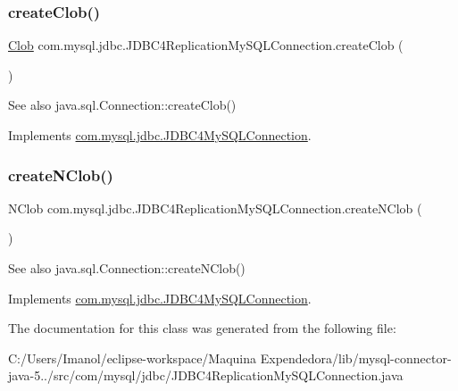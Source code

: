 \subsubsection{\texorpdfstring{create\+Clob()}{createClob()}}
{\footnotesize\ttfamily \mbox{\hyperlink{classcom_1_1mysql_1_1jdbc_1_1_clob}{Clob}} com.\+mysql.\+jdbc.\+J\+D\+B\+C4\+Replication\+My\+S\+Q\+L\+Connection.\+create\+Clob (\begin{DoxyParamCaption}{ }\end{DoxyParamCaption})}

\begin{DoxySeeAlso}{See also}
java.\+sql.\+Connection\+::create\+Clob() 
\end{DoxySeeAlso}


Implements \mbox{\hyperlink{interfacecom_1_1mysql_1_1jdbc_1_1_j_d_b_c4_my_s_q_l_connection}{com.\+mysql.\+jdbc.\+J\+D\+B\+C4\+My\+S\+Q\+L\+Connection}}.

\mbox{\label{classcom_1_1mysql_1_1jdbc_1_1_j_d_b_c4_replication_my_s_q_l_connection_ae41d8d69ab45f2c830674a653fa9bff2}} 
\subsubsection{\texorpdfstring{create\+N\+Clob()}{createNClob()}}
{\footnotesize\ttfamily N\+Clob com.\+mysql.\+jdbc.\+J\+D\+B\+C4\+Replication\+My\+S\+Q\+L\+Connection.\+create\+N\+Clob (\begin{DoxyParamCaption}{ }\end{DoxyParamCaption})}

\begin{DoxySeeAlso}{See also}
java.\+sql.\+Connection\+::create\+N\+Clob() 
\end{DoxySeeAlso}


Implements \mbox{\hyperlink{interfacecom_1_1mysql_1_1jdbc_1_1_j_d_b_c4_my_s_q_l_connection}{com.\+mysql.\+jdbc.\+J\+D\+B\+C4\+My\+S\+Q\+L\+Connection}}.



The documentation for this class was generated from the following file\+:\begin{DoxyCompactItemize}
\item 
C\+:/\+Users/\+Imanol/eclipse-\/workspace/\+Maquina Expendedora/lib/mysql-\/connector-\/java-\/5../src/com/mysql/jdbc/J\+D\+B\+C4\+Replication\+My\+S\+Q\+L\+Connection.\+java\end{DoxyCompactItemize}
